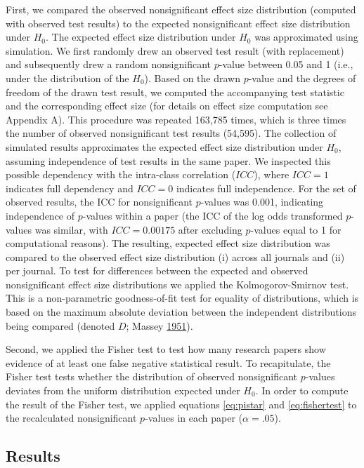 \documentclass[a5paper]{book}
\begin{document}
First, we compared the observed nonsignificant effect size distribution
(computed with observed test results) to the expected nonsignificant
effect size distribution under \(H_0\). The expected effect size
distribution under \(H_0\) was approximated using simulation. We first
randomly drew an observed test result (with replacement) and
subsequently drew a random nonsignificant \(p\)-value between 0.05 and 1
(i.e., under the distribution of the \(H_0\)). Based on the drawn
\(p\)-value and the degrees of freedom of the drawn test result, we
computed the accompanying test statistic and the corresponding effect
size (for details on effect size computation see Appendix A). This
procedure was repeated 163,785 times, which is three times the number of
observed nonsignificant test results (54,595). The collection of
simulated results approximates the expected effect size distribution
under \(H_0\), assuming independence of test results in the same paper.
We inspected this possible dependency with the intra-class correlation
(\(ICC\)), where \(ICC=1\) indicates full dependency and \(ICC=0\)
indicates full independence. For the set of observed results, the ICC
for nonsignificant \(p\)-values was 0.001, indicating independence of
\(p\)-values within a paper (the ICC of the log odds transformed
\(p\)-values was similar, with \(ICC=0.00175\) after excluding
\(p\)-values equal to 1 for computational reasons). The resulting,
expected effect size distribution was compared to the observed effect
size distribution (i) across all journals and (ii) per journal. To test
for differences between the expected and observed nonsignificant effect
size distributions we applied the Kolmogorov-Smirnov test. This is a
non-parametric goodness-of-fit test for equality of distributions, which
is based on the maximum absolute deviation between the independent
distributions being compared (denoted \(D\); Massey
\protect\hyperlink{ref-doi:10.2307ux2f2280095}{1951}).

Second, we applied the Fisher test to test how many research papers show
evidence of at least one false negative statistical result. To
recapitulate, the Fisher test tests whether the distribution of observed
nonsignificant \(p\)-values deviates from the uniform distribution
expected under \(H_0\). In order to compute the result of the Fisher
test, we applied equations \eqref{eq:pistar} and \eqref{eq:fishertest} to
the recalculated nonsignificant \(p\)-values in each paper
(\(\alpha=.05\)).

\subsection{Results}\label{results}
\end{document}
